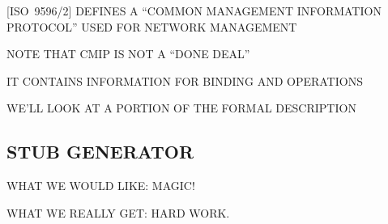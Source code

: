 \begin{bwslide}

\begin{nrtc}
\item	{}[ISO~9596/2] DEFINES A ``COMMON MANAGEMENT INFORMATION PROTOCOL''
	USED FOR NETWORK MANAGEMENT
    \begin{nrtc}
    \item	NOTE THAT CMIP IS NOT A ``DONE DEAL''
    \end{nrtc}

\item	IT CONTAINS INFORMATION FOR BINDING AND OPERATIONS

\item	WE'LL LOOK AT A PORTION OF THE FORMAL DESCRIPTION
\end{nrtc}
\end{bwslide}










\begin{bwslide}
\part*	{STUB GENERATOR}\bf

\begin{nrtc}
\item	WHAT WE WOULD LIKE: MAGIC!

\item	WHAT WE REALLY GET: HARD WORK.
\end{nrtc}
\end{bwslide}



